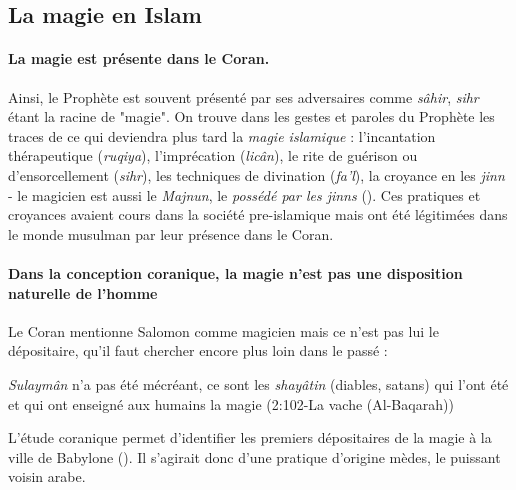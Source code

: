 \subsection*{La magie en Islam}

\paragraph{La magie est présente dans le Coran.}  Ainsi, le Prophète est souvent présenté par ses adversaires comme \textit{sâhir}, \textit{sihr} étant la racine de "magie".  On trouve dans les gestes et paroles du Prophète les traces de ce qui deviendra plus tard la \textit{magie islamique} : l’incantation thérapeutique (\textit{ruqiya}), l’imprécation (\textit{licân}), le rite de guérison ou d’ensorcellement (\textit{sihr}), les techniques de divination (\textit{fa’l}), la croyance en les \textit{jinn} - le magicien est aussi le \textit{Majnun}, le \textit{possédé par les jinns} (\cite{Fadh_1987}). Ces pratiques et croyances avaient cours dans la société pre-islamique mais ont été légitimées dans le monde musulman par leur présence dans le Coran.
 

\paragraph{Dans la conception coranique, la magie n'est pas une disposition naturelle de l'homme} Le Coran mentionne Salomon comme magicien mais ce n'est pas lui le dépositaire, qu'il faut chercher encore plus loin dans le passé : 
\begin{singlequote}
     \textit{Sulaymân} n'a pas été mécréant, ce sont les \textit{shayâtin} (diables, satans) qui l'ont été et qui ont enseigné aux humains la magie  (2:102-La vache (Al-Baqarah))
\end{singlequote}
L'étude coranique permet d'identifier les premiers dépositaires de la magie à la ville de Babylone 
 (\cite{hames_coran_2007}). Il s'agirait donc d'une pratique d'origine mèdes, le puissant voisin arabe. 

